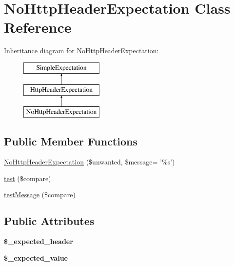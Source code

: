 \hypertarget{class_no_http_header_expectation}{
\section{NoHttpHeaderExpectation Class Reference}
\label{class_no_http_header_expectation}
}
Inheritance diagram for NoHttpHeaderExpectation:\begin{figure}[H]
\begin{center}
\leavevmode
\includegraphics[height=3.000000cm]{class_no_http_header_expectation}
\end{center}
\end{figure}
\subsection*{Public Member Functions}
\begin{DoxyCompactItemize}
\item 
\hyperlink{class_no_http_header_expectation_a1ec58432436426be602808bded11d776}{NoHttpHeaderExpectation} (\$unwanted, \$message= '\%s')
\item 
\hyperlink{class_no_http_header_expectation_a3eeb88677fbcc6f33f719aec17d93013}{test} (\$compare)
\item 
\hyperlink{class_no_http_header_expectation_a5fcd01471616efc71a8e28d2e8380ccb}{testMessage} (\$compare)
\end{DoxyCompactItemize}
\subsection*{Public Attributes}
\begin{DoxyCompactItemize}
\item 
\hypertarget{class_no_http_header_expectation_a422a811b2163bf6965a9ae82fd2a5bd6}{
{\bfseries \$\_\-expected\_\-header}}
\label{class_no_http_header_expectation_a422a811b2163bf6965a9ae82fd2a5bd6}

\item 
\hypertarget{class_no_http_header_expectation_a13a8f90b97d0bddf87320eb39ee802bf}{
{\bfseries \$\_\-expected\_\-value}}
\label{class_no_http_header_expectation_a13a8f90b97d0bddf87320eb39ee802bf}

\end{DoxyCompactItemize}


